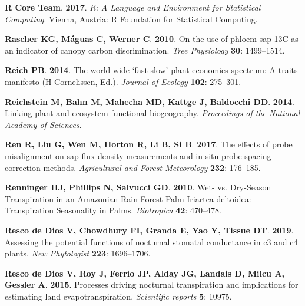 \documentclass[11pt,twoside]{reedthesis}
\begin{document}
\hypertarget{ref-RCoreTeam2017}{}
\textbf{\textnormal{R Core Team}}. \textbf{2017}. \emph{R: A Language
and Environment for Statistical Computing}. Vienna, Austria: R
Foundation for Statistical Computing.

\hypertarget{ref-Rascher2010}{}
\textbf{\textnormal{Rascher KG}, \textnormal{Máguas C},
\textnormal{Werner C}}. \textbf{2010}. On the use of phloem sap 13C as
an indicator of canopy carbon discrimination. \emph{Tree Physiology}
\textbf{30}: 1499--1514.

\hypertarget{ref-reich_world-wide_2014}{}
\textbf{\textnormal{Reich PB}}. \textbf{2014}. The world-wide
`fast-slow' plant economics spectrum: A traits manifesto (H Cornelissen,
Ed.). \emph{Journal of Ecology} \textbf{102}: 275--301.

\hypertarget{ref-Reichstein2014}{}
\textbf{\textnormal{Reichstein M}, \textnormal{Bahn M},
\textnormal{Mahecha MD}, \textnormal{Kattge J}, \textnormal{Baldocchi
DD}}. \textbf{2014}. Linking plant and ecosystem functional
biogeography. \emph{Proceedings of the National Academy of Sciences}.

\hypertarget{ref-Ren2017}{}
\textbf{\textnormal{Ren R}, \textnormal{Liu G}, \textnormal{Wen M},
\textnormal{Horton R}, \textnormal{Li B}, \textnormal{Si B}}.
\textbf{2017}. The effects of probe misalignment on sap flux density
measurements and in situ probe spacing correction methods.
\emph{Agricultural and Forest Meteorology} \textbf{232}: 176--185.

\hypertarget{ref-renninger2010}{}
\textbf{\textnormal{Renninger HJ}, \textnormal{Phillips N},
\textnormal{Salvucci GD}}. \textbf{2010}. Wet- vs. Dry-Season
Transpiration in an Amazonian Rain Forest Palm Iriartea deltoidea:
Transpiration Seasonality in Palms. \emph{Biotropica} \textbf{42}:
470--478.

\hypertarget{ref-RescodeDios2019}{}
\textbf{\textnormal{Resco de Dios V}, \textnormal{Chowdhury FI},
\textnormal{Granda E}, \textnormal{Yao Y}, \textnormal{Tissue DT}}.
\textbf{2019}. Assessing the potential functions of nocturnal stomatal
conductance in c3 and c4 plants. \emph{New Phytologist} \textbf{223}:
1696--1706.

\hypertarget{ref-rescodedios2015}{}
\textbf{\textnormal{Resco de Dios V}, \textnormal{Roy J},
\textnormal{Ferrio JP}, \textnormal{Alday JG}, \textnormal{Landais D},
\textnormal{Milcu A}, \textnormal{Gessler A}}. \textbf{2015}. Processes
driving nocturnal transpiration and implications for estimating land
evapotranspiration. \emph{Scientific reports} \textbf{5}: 10975.
\end{document}
